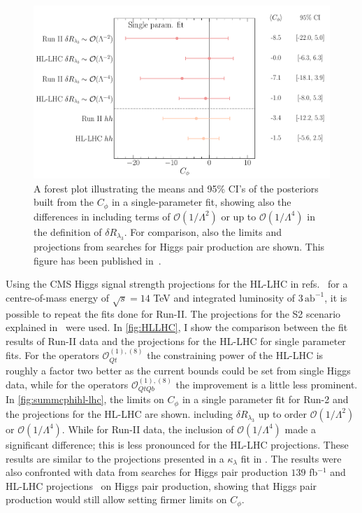 	\begin{figure}
		\begin{center}
			\includegraphics[width=0.75\linewidth]{fig/uebeblick_forest_cphi_singleparam}
		\end{center}
		\caption{A forest plot illustrating the means and 95\% CI's of the posteriors built from the  $C_\phi$  in a single-parameter fit, showing also the differences in including terms of $\mathcal{O}(1/\Lambda^2)$ or up to $\mathcal{O}(1/\Lambda^4)$ in the definition of $\delta R_{\lambda_3}$. For comparison, also the limits and projections from searches for Higgs pair production are shown. This figure has been published in~\cite{Alasfar:2022zyr}.  \label{fig:summcphihl-lhc}  }
	\end{figure}
	Using the CMS Higgs signal strength projections for the HL-LHC in refs.~\cite{CMS-PAS-FTR-18-011,twiki} for a centre-of-mass energy of $\sqrt{s}=14$ TeV and integrated luminosity of $ 3\, \mathrm{ab}^{-1}$, it is possible to repeat the fits done for Run-II.   The projections for the S2 scenario explained in~\cite{Cepeda:2019klc} were used. 
	In \autoref{fig:HLLHC}, I show the comparison between the fit results of Run-II data and the projections for the HL-LHC for single parameter fits. For the operators $\mathcal{O}_{Qt}^{(1),(8)}$ the constraining power of the HL-LHC is roughly a factor two better as the current bounds could be set from single Higgs data, while for the operators $\mathcal{O}_{QtQb}^{(1),(8)}$ the improvement is a little less prominent.
	 In \autoref{fig:summcphihl-lhc}, the limits on $C_{\phi}$ in a single parameter fit for Run-2 and the projections for the HL-LHC are shown.
	including  $\delta R_{\lambda_3}$ up to order $\mathcal{O}(1/\Lambda^2)$ or $\mathcal{O}(1/\Lambda^4)$. While for Run-II data, the inclusion of $\mathcal{O}(1/\Lambda^4)$ made a significant difference; this is less pronounced for the HL-LHC projections. These results are similar to the projections presented in a $\kappa_{\lambda}$ fit in \cite{DiMicco:2019ngk}. 
	The results were also confronted with data from searches for Higgs pair production $139$ fb$^{-1}$ \cite{ATLAS:2021jki}  and HL-LHC projections~\cite{CMS:2018ccd} on Higgs pair production, showing that Higgs pair production would still allow setting firmer limits on $C_{\phi}$. 
